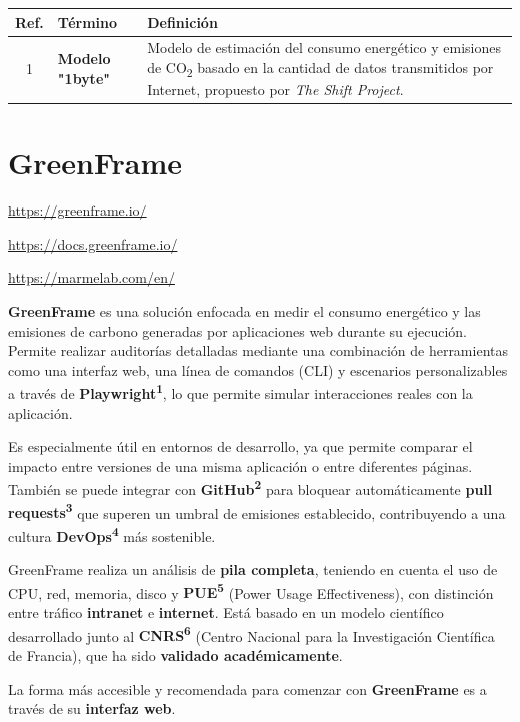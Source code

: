 \documentclass[12pt,a4paper]{report}
\begin{document}
\begin{table}[h]
\centering
\begin{tabular}{@{}cll@{}}
\toprule
\textbf{Ref.} & \textbf{Término} & \textbf{Definición} \\
\midrule
1 & \textbf{Modelo "1byte"} & Modelo de estimación del consumo energético y emisiones de CO\textsubscript{2} basado en la cantidad de datos transmitidos por Internet, propuesto por \textit{The Shift Project}. \\
\bottomrule
\end{tabular}
\end{table}

\section*{\textbf{GreenFrame}}

\url{https://greenframe.io/}

\url{https://docs.greenframe.io/}

\url{https://marmelab.com/en/}

\textbf{GreenFrame} es una solución enfocada en medir el consumo energético y las emisiones de carbono generadas por aplicaciones web durante su ejecución. Permite realizar auditorías detalladas mediante una combinación de herramientas como una interfaz web, una línea de comandos (CLI) y escenarios personalizables a través de \textbf{Playwright\textsuperscript{1}}, lo que permite simular interacciones reales con la aplicación.

Es especialmente útil en entornos de desarrollo, ya que permite comparar el impacto entre versiones de una misma aplicación o entre diferentes páginas. También se puede integrar con \textbf{GitHub\textsuperscript{2}} para bloquear automáticamente \textbf{pull requests\textsuperscript{3}} que superen un umbral de emisiones establecido, contribuyendo a una cultura \textbf{DevOps\textsuperscript{4}} más sostenible.

GreenFrame realiza un análisis de \textbf{pila completa}, teniendo en cuenta el uso de CPU, red, memoria, disco y \textbf{PUE\textsuperscript{5}} (Power Usage Effectiveness), con distinción entre tráfico \textbf{intranet} e \textbf{internet}. Está basado en un modelo científico desarrollado junto al \textbf{CNRS\textsuperscript{6}} (Centro Nacional para la Investigación Científica de Francia), que ha sido \textbf{validado académicamente}.

La forma más accesible y recomendada para comenzar con \textbf{GreenFrame} es a través de su \textbf{interfaz web}.
\end{document}
